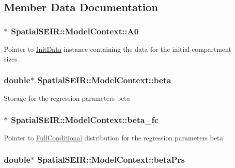 \subsection{Member Data Documentation}
\hypertarget{classSpatialSEIR_1_1ModelContext_abe200f29b14eee50f6626d6280596785}{
\subsubsection[{A0}]{$\ast$ Spatial\-S\-E\-I\-R\-::\-Model\-Context\-::\-A0}}\label{classSpatialSEIR_1_1ModelContext_abe200f29b14eee50f6626d6280596785}
Pointer to \hyperlink{classSpatialSEIR_1_1InitData}{Init\-Data} instance containing the data for the initial compartment sizes. \hypertarget{classSpatialSEIR_1_1ModelContext_a7e15e37b3aa868f1b56d0cf92a9839c8}{
\subsubsection[{beta}]{\setlength{\rightskip}{0pt plus 5cm}double$\ast$ Spatial\-S\-E\-I\-R\-::\-Model\-Context\-::beta}}\label{classSpatialSEIR_1_1ModelContext_a7e15e37b3aa868f1b56d0cf92a9839c8}
Storage for the regression parameters beta \hypertarget{classSpatialSEIR_1_1ModelContext_a63278983ee123db534919685c46fbb5b}{
\subsubsection[{beta\-\_\-fc}]{$\ast$ Spatial\-S\-E\-I\-R\-::\-Model\-Context\-::beta\-\_\-fc}}\label{classSpatialSEIR_1_1ModelContext_a63278983ee123db534919685c46fbb5b}
Pointer to \hyperlink{classSpatialSEIR_1_1FullConditional}{Full\-Conditional} distribution for the regression parameters beta \hypertarget{classSpatialSEIR_1_1ModelContext_abe52e0e1b4ad61cc0a71c104428c7dfc}{
\subsubsection[{beta\-Prs}]{\setlength{\rightskip}{0pt plus 5cm}double$\ast$ Spatial\-S\-E\-I\-R\-::\-Model\-Context\-::beta\-Prs}}\label{classSpatialSEIR_1_1ModelContext_abe52e0e1b4ad61cc0a71c104428c7dfc}
